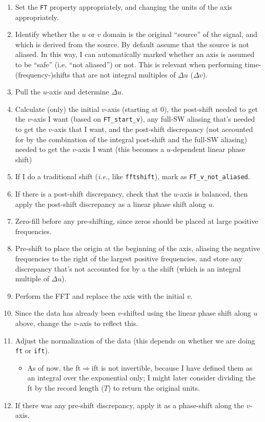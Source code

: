 \begin{enumerate}
    \item Set the \texttt{FT} property appropriately, and changing the units of the axis appropriately.
    \item Identify whether the $u$ or $v$ domain is the original ``source'' of the signal, and which is derived from the source.
        By default assume that the source is not aliased.
        In this way, I can automatically marked whether an axis is
            assumed to be ``safe'' (i.e. ``not aliased'') or not.
        This is relevant when performing time- (frequency-)shifts that
            are not integral multiples of $\Delta u$ ($\Delta v$).
    \item Pull the $u$-axis and determine $\Delta u$.
    \item Calculate (only) the initial $v$-axis (starting at 0),
        the post-shift needed to get the $v$-axis I want (based on \texttt{FT_start_v}),
        any full-SW aliasing that's needed to get the $v$-axis that I want,
        and the post-shift discrepancy (not accounted for by the combination of
        the integral post-shift and the full-SW aliasing) needed to get the
        $v$-axis I want (this becomes a $u$-dependent linear phase shift)
    \item If I do a traditional shift (\textit{i.e.}, like \texttt{fftshift}), mark as \texttt{FT_v_not_aliased}.
    \item If there is a post-shift discrepancy, check that the $u$-axis is
        balanced, then apply the post-shift discrepancy as a linear phase shift
        along $u$.
    \item Zero-fill before any pre-shifting, since zeros should be placed at large positive frequencies.
    \item Pre-shift to place the origin at the beginning of the axis, aliasing
        the negative frequencies to the right of the largest positive
        frequencies, and store any discrepancy that's not accounted for by a
        the shift (which is an integral multiple of $\Delta u$).
    \item Perform the FFT and replace the axis with the initial $v$.
    \item Since the data has already been $v$-shifted using the linear phase
        shift along $u$ above, change the $v$-axis to reflect this.
    \item Adjust the normalization of the data (this depends on whether we are doing \texttt{ft} or \texttt{ift}).
        \begin{itemize}
            \item As of now, the ft$\Rightarrow$ift is not invertible, because I have defined them as an integral over the exponential only; I might later consider dividing the ft by the record length ($T$) to return the original units.
        \end{itemize}
    \item If there was any pre-shift discrepancy, apply it as a phase-shift along the $v$-axis.
\end{enumerate}
